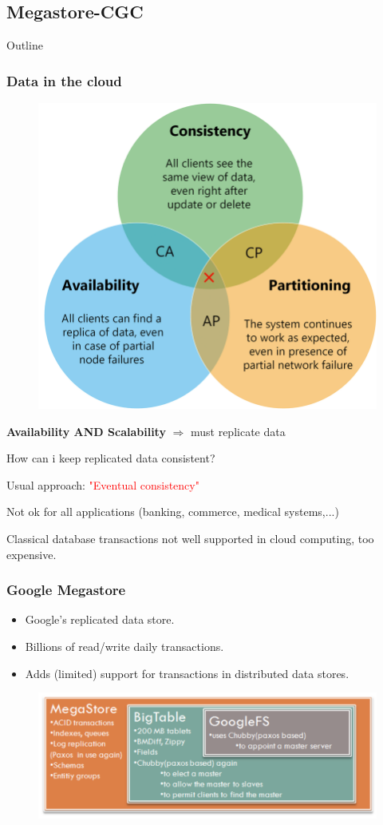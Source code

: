 \documentclass{beamer}
\begin{document}
\subsection{Megastore-CGC}
\begin{frame}{Outline}
\end{frame}
\begin{frame}
    \frametitle{Data in the cloud}
\begin{figure}
    \includegraphics[width=.7\textwidth]{img/cap.png}
\end{figure}
\end{frame}
\begin{frame}
    \textbf{Availability AND Scalability} $\Rightarrow$ must replicate data

    How can i keep replicated data consistent?
    
    \bigskip
    Usual approach: \textcolor{red}{"Eventual consistency"}

    \bigskip
    Not ok for all applications (banking, commerce, medical systems,...)

    \bigskip
    Classical database transactions not well supported  in cloud computing, too expensive.
\end{frame}
\begin{frame}
    \frametitle{Google Megastore}
    \begin{itemize}
        \item Google's replicated data store.
        \item Billions  of read/write daily transactions.
        \item Adds (limited) support for transactions  in distributed data stores.   
    \end{itemize}
    \begin{figure}
        \includegraphics[width=\textwidth]{img/megastore.png}
    \end{figure}
\end{frame}
\end{document}
